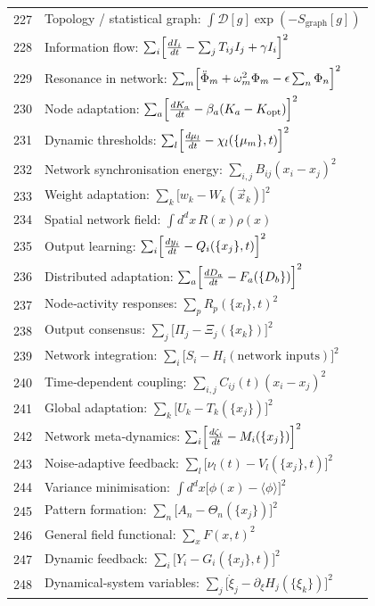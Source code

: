 \documentclass[12pt,a4paper]{article}
\begin{document}
\begin{longtable}{r l}
		227 & Topology / statistical graph: $\int\mathcal{D}[g]\exp(-S_{\text{graph}}[g])$ \\
		228 & Information flow: $\sum_i\Bigl[\frac{dI_i}{dt} - \sum_j T_{ij}I_j + \gamma I_i\Bigr]^2$ \\
		229 & Resonance in network: $\sum_m\Bigl[\ddot\Phi_m + \omega_m^2\Phi_m - \epsilon\sum_n\Phi_n\Bigr]^2$ \\
		230 & Node adaptation: $\sum_a\Bigl[\frac{dK_a}{dt} - \beta_a(K_a - K_{\text{opt}})\Bigr]^2$ \\
		231 & Dynamic thresholds: $\sum_l\Bigl[\frac{d\mu_l}{dt} - \chi_l(\{\mu_m\},t)\Bigr]^2$ \\
		232 & Network synchronisation energy: $\sum_{i,j}B_{ij}(x_i - x_j)^2$ \\
		233 & Weight adaptation: $\sum_k\bigl[w_k - W_k(\vec x_k)\bigr]^2$ \\
		234 & Spatial network field: $\int d^dx\,R(x)\rho(x)$ \\
		235 & Output learning: $\sum_i\Bigl[\frac{dy_i}{dt} - Q_i(\{x_j\},t)\Bigr]^2$ \\
		236 & Distributed adaptation: $\sum_a\Bigl[\frac{dD_a}{dt} - F_a(\{D_b\})\Bigr]^2$ \\
		237 & Node‑activity responses: $\sum_p R_p(\{x_l\},t)^2$ \\
		238 & Output consensus: $\sum_j\bigl[\Pi_j - \Xi_j(\{x_k\})\bigr]^2$ \\
		239 & Network integration: $\sum_i\bigl[S_i - H_i(\text{network inputs})\bigr]^2$ \\
		240 & Time‑dependent coupling: $\sum_{i,j}C_{ij}(t)(x_i - x_j)^2$ \\
		241 & Global adaptation: $\sum_k\bigl[U_k - T_k(\{x_j\})\bigr]^2$ \\
		242 & Network meta‑dynamics: $\sum_i\Bigl[\frac{d\zeta_i}{dt} - M_i(\{x_j\})\Bigr]^2$ \\
		243 & Noise‑adaptive feedback: $\sum_l\bigl[\nu_l(t) - V_l(\{x_j\},t)\bigr]^2$ \\
		244 & Variance minimisation: $\int d^dx\bigl[\phi(x) - \langle\phi\rangle\bigr]^2$ \\
		245 & Pattern formation: $\sum_n\bigl[A_n - \Theta_n(\{x_j\})\bigr]^2$ \\
		246 & General field functional: $\sum_x F(x,t)^2$ \\
		247 & Dynamic feedback: $\sum_i\bigl[Y_i - G_i(\{x_j\},t)\bigr]^2$ \\
		248 & Dynamical‑system variables: $\sum_j\bigl[\dot\xi_j - \partial_\xi H_j(\{\xi_k\})\bigr]^2$ \\

\end{longtable}
\end{document}
